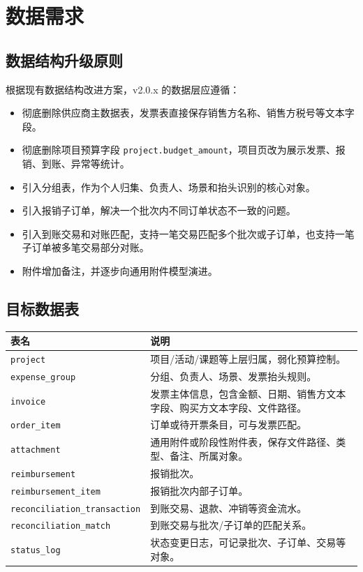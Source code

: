 \documentclass[UTF8,zihao=-4]{ctexart}
\begin{document}
\section{数据需求}

\subsection{数据结构升级原则}

根据现有数据结构改进方案，v2.0.x 的数据层应遵循：

\begin{itemize}
  \item 彻底删除供应商主数据表，发票表直接保存销售方名称、销售方税号等文本字段。
  \item 彻底删除项目预算字段 \texttt{project.budget\_amount}，项目页改为展示发票、报销、到账、异常等统计。
  \item 引入分组表，作为个人归集、负责人、场景和抬头识别的核心对象。
  \item 引入报销子订单，解决一个批次内不同订单状态不一致的问题。
  \item 引入到账交易和对账匹配，支持一笔交易匹配多个批次或子订单，也支持一笔子订单被多笔交易部分对账。
  \item 附件增加备注，并逐步向通用附件模型演进。
\end{itemize}

\subsection{目标数据表}

\begin{longtable}{p{4.2cm}p{10.2cm}}
\toprule
表名 & 说明 \\
\midrule
\texttt{project} & 项目/活动/课题等上层归属，弱化预算控制。 \\
\texttt{expense\_group} & 分组、负责人、场景、发票抬头规则。 \\
\texttt{invoice} & 发票主体信息，包含金额、日期、销售方文本字段、购买方文本字段、文件路径。 \\
\texttt{order\_item} & 订单或待开票条目，可与发票匹配。 \\
\texttt{attachment} & 通用附件或阶段性附件表，保存文件路径、类型、备注、所属对象。 \\
\texttt{reimbursement} & 报销批次。 \\
\texttt{reimbursement\_item} & 报销批次内部子订单。 \\
\texttt{reconciliation\_transaction} & 到账交易、退款、冲销等资金流水。 \\
\texttt{reconciliation\_match} & 到账交易与批次/子订单的匹配关系。 \\
\texttt{status\_log} & 状态变更日志，可记录批次、子订单、交易等对象。 \\
\bottomrule
\end{longtable}
\end{document}
